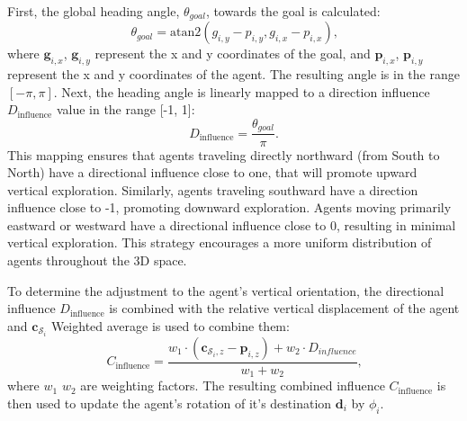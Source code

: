         First, the global heading angle, $\theta_{goal}$, towards the goal is calculated: 
        \begin{equation}
            \theta_{goal} = \text{atan2}(g_{i,y} - p_{i,y}, g_{i,x} - p_{i,x})\text{,}
        \end{equation}
        where $\mathbf{g}_{i, x}$, $\mathbf{g}_{i, y}$ represent the x and y coordinates of the goal, and $\mathbf{p}_{i, x}$, $\mathbf{p}_{i, y}$ represent the x and y coordinates of the agent.
        The resulting angle is in the range $[-\pi, \pi]$.
        Next, the heading angle is linearly mapped to a direction influence $D_{\text{influence}}$ value in the range [-1, 1]:
        \begin{equation}
            D_{\text{influence}} = \frac{\theta_{goal}}{\pi}\text{.}
        \end{equation}
        This mapping ensures that agents traveling directly northward (from South to North) have a directional influence close to one, that will promote upward vertical exploration. 
        Similarly, agents traveling southward have a direction influence close to -1, promoting downward exploration. 
        Agents moving primarily eastward or westward have a directional influence close to 0, resulting in minimal vertical exploration.
        This strategy encourages a more uniform distribution of agents throughout the 3D space. 

        To determine the adjustment to the agent's vertical orientation, the directional influence $D_{\text{influence}}$ is combined with the relative vertical displacement of the agent and $\mathbf{c}_{\mathcal{S}_i}$
        Weighted average is used to combine them: 
        \begin{equation}
            \label{eqn:combined_influace}
            C_{\text{influence}} = \frac{w_1 \cdot (\mathbf{c}_{\mathcal{S}_i,z} - \mathbf{p}_{i,z}) + w_2 \cdot D_{influence}}{w_1 + w_2}\text{,}
        \end{equation} 
        where $w_1$ $w_2$ are weighting factors. The resulting combined influence $C_{\text{influence}}$ is then used to update the agent's rotation of it's destination $\mathbf{d}_i$ by $\phi_i$.


